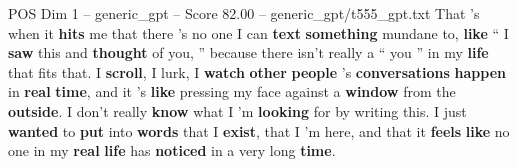 \begin{textsample}{POS Dim 1 – generic\_gpt – Score 82.00 – generic\_gpt/t555\_gpt.txt}
That ’s when it \textbf{hits} me that there ’s no one I can \textbf{text} \textbf{something} mundane to, \textbf{like} “ I \textbf{saw} this and \textbf{thought} of you, ” because there isn't really a “ you ” in my \textbf{life} that fits that.
I \textbf{scroll}, I lurk, I \textbf{watch} \textbf{other} \textbf{people} ’s \textbf{conversations} \textbf{happen} in \textbf{real} \textbf{time}, and it ’s \textbf{like} pressing my face against a \textbf{window} from the \textbf{outside}.
I don't really \textbf{know} what I ’m \textbf{looking} for by writing this.
I just \textbf{wanted} to \textbf{put} into \textbf{words} that I \textbf{exist}, that I ’m here, and that it \textbf{feels} \textbf{like} no one in my \textbf{real} \textbf{life} has \textbf{noticed} in a very long \textbf{time}.

\end{textsample}
